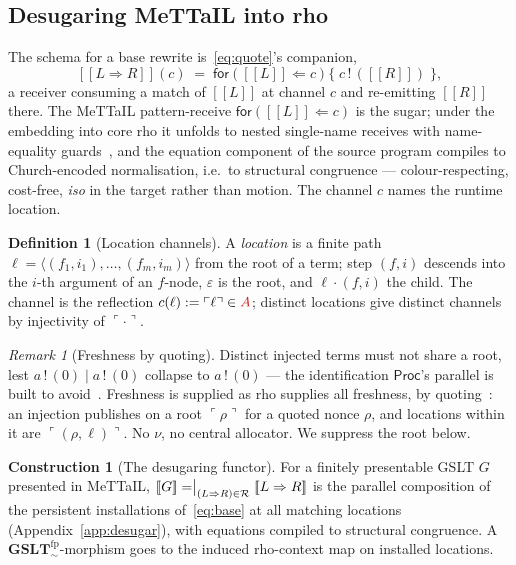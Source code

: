 \documentclass[11pt]{article}
\newcommand{\sem}[1]{[\![#1]\!]}
\newcommand{\refl}[1]{\ulcorner #1 \urcorner}
\newcommand{\Proc}{\mathsf{Proc}}
\newcommand{\GSLTfp}{\mathbf{GSLT}^{\mathrm{fp}}_{\!\sim}}
\newcommand{\for}[2]{\mathsf{for}(#1 \Leftarrow #2)}
\newcommand{\out}[2]{#1\,!\,(#2)}
\newcommand{\rc}[1]{\textcolor{redcopy}{#1}}   %
\newcommand{\As}{\rc{A}}
\theoremstyle{plain}
\theoremstyle{definition}
\newtheorem{definition}[theorem]{Definition}
\newtheorem{construction}[theorem]{Construction}
\theoremstyle{remark}
\newtheorem{remark}[theorem]{Remark}
\begin{document}
\subsection{Desugaring MeTTaIL into rho}\label{sec:desugar}

The schema for a base rewrite is~\eqref{eq:quote}'s companion,
\begin{equation}\label{eq:base}
\sem{L\Rightarrow R}(c)\;=\;\for{\sem{L}}{c}\bigl\{\;\out{c}{\sem{R}}\;\bigr\},
\end{equation}
a receiver consuming a match of $\sem L$ at channel $c$ and re-emitting $\sem R$ there. The MeTTaIL
pattern-receive $\for{\sem L}{c}$ is the sugar; under the embedding into core rho it unfolds to nested
single-name receives with name-equality guards~\cite[\S2.2]{optimal}, and the equation component of
the source program compiles to Church-encoded normalisation, i.e.\ to structural congruence ---
colour-respecting, cost-free, \emph{iso} in the target rather than motion. The channel $c$ names the
runtime location.

\begin{definition}[Location channels]\label{def:loc}
A \emph{location} is a finite path $\ell=\langle(f_1,i_1),\dots,(f_m,i_m)\rangle$ from the root of a
term; step $(f,i)$ descends into the $i$-th argument of an $f$-node, $\varepsilon$ is the root, and
$\ell\cdot(f,i)$ the child. The channel is the reflection $c(\ell):=\refl{\ell}\in\As$; distinct
locations give distinct channels by injectivity of $\refl{\cdot}$.
\end{definition}

\begin{remark}[Freshness by quoting]\label{rem:fresh}
Distinct injected terms must not share a root, lest $\out{a}{0}\mid\out{a}{0}$ collapse to
$\out{a}{0}$ --- the identification $\Proc$'s parallel is built to avoid~\cite[\S5]{knotrho}.
Freshness is supplied as rho supplies all freshness, by quoting~\cite[\S2]{knotrho}: an injection
publishes on a root $\refl{\rho}$ for a quoted nonce $\rho$, and locations within it are
$\refl{(\rho,\ell)}$. No $\nu$, no central allocator. We suppress the root below.
\end{remark}

\begin{construction}[The desugaring functor]\label{con:functor}
For a finitely presentable GSLT $G$ presented in MeTTaIL,
$\sem{G}=\bigm|_{(L\Rightarrow R)\in\mathcal R}\sem{L\Rightarrow R}$ is the parallel composition of the
persistent installations of~\eqref{eq:base} at all matching locations (Appendix~\ref{app:desugar}),
with equations compiled to structural congruence. A $\GSLTfp$-morphism goes to the induced rho-context
map on installed locations.
\end{construction}
\end{document}
